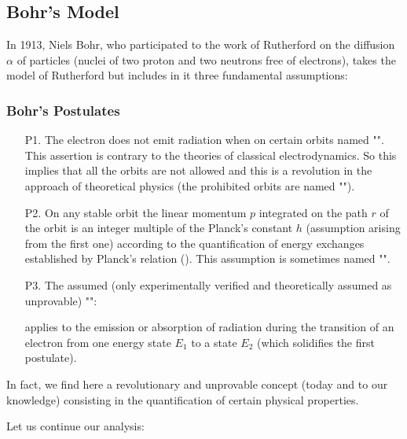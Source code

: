 \subsection{Bohr's Model}\label{bohr model}

In 1913, Niels Bohr, who participated to the work of Rutherford on the diffusion $\alpha$ of particles (nuclei of two proton and two neutrons free of electrons), takes the model of Rutherford but includes in it three fundamental assumptions:

\subsubsection{Bohr's Postulates}\label{bohr postulates}

	\begin{enumerate}
		\item[P1.] The electron does not emit radiation when on certain orbits named "". This assertion is contrary to the theories of classical electrodynamics. So this implies that all the orbits are not allowed and this is a revolution in the approach of theoretical physics (the prohibited orbits are named "").
		
		\item[P2.] On any stable orbit the linear momentum  $p$ integrated on the path $r$ of the orbit is an integer multiple of the Planck's constant $h$ (assumption arising from the first one) according to the quantification of energy exchanges established by Planck's relation (). This assumption is sometimes named "".
		
		\item[P3.] The assumed (only experimentally verified and theoretically assumed as unprovable) "":
			
applies to the emission or absorption of radiation during the transition of an electron from one energy state $E_1$ to a state $E_2$ (which solidifies the first postulate).
	\end{enumerate}
In fact, we find here a revolutionary and unprovable concept (today and to our knowledge) consisting in the quantification of certain physical properties.

Let us continue our analysis:

